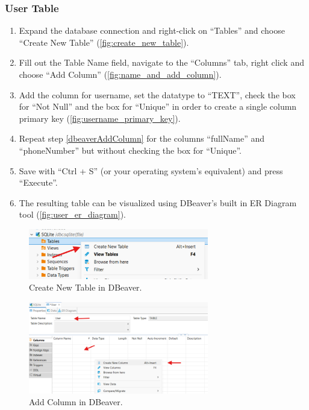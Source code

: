 \documentclass[a4paper,11pt,oneside]{article}
\begin{document}
\begin{sloppypar}
\subsubsection{User Table}
\label{dbeaverUserTable}

\begin{enumerate}
  \item \label{dbeaverCreateTable} Expand the database connection and right-click on ``Tables'' and choose ``Create New Table'' (\autoref{fig:create_new_table}).
  \item Fill out the Table Name field, navigate to the ``Columns'' tab, right click and choose ``Add Column'' (\autoref{fig:name_and_add_column}).
  \item \label{dbeaverAddColumn} Add the column for username, set the datatype to ``TEXT'', check the box for ``Not Null'' and the box for ``Unique'' in order to create a single column primary key (\autoref{fig:username_primary_key}).
  \item Repeat step \ref{dbeaverAddColumn} for the columns ``fullName'' and ``phoneNumber'' but without checking the box for ``Unique''.
  \item Save with ``Ctrl + S'' (or your operating system's equivalent) and press ``Execute''.
  \item The resulting table can be visualized using DBeaver's built in ER Diagram tool (\autoref{fig:user_er_diagram}). 
\end{enumerate}

\begin{figure}[!htb]
  \centering
  \includegraphics[width=0.7\textwidth]{dbeaver/create_new_table.png}
  \caption{Create New Table in DBeaver.}
  \label{fig:create_new_table}
\end{figure}

\begin{figure}[!htb]
  \centering
  \includegraphics[width=0.7\textwidth]{dbeaver/name_and_add_column.png}
  \caption{Add Column in DBeaver.}
  \label{fig:name_and_add_column}
\end{figure}


\end{sloppypar}
\end{document}
